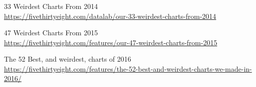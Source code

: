 \documentclass[12pt]{beamer}\usepackage[]{graphicx}\usepackage[]{color}
\begin{document}

\begin{frame}
\frametitle{}
\begin{center}
\end{center}
\end{frame}


\begin{frame}
\frametitle{}
\begin{center}
\end{center}
\end{frame}


\begin{frame}
\frametitle{}
\begin{center}
\end{center}
\end{frame}


\begin{frame}
\frametitle{}
\begin{center}
\end{center}
\end{frame}


\begin{frame}
\begin{center}
\Huge{}
\end{center}
\end{frame}


\begin{frame}
\frametitle{}

\bi
	\item 33 Weirdest Charts From 2014 \\
	{\tiny \url{https://fivethirtyeight.com/datalab/our-33-weirdest-charts-from-2014}}
	\item 47 Weirdest Charts From 2015  \\
	{\tiny \url{https://fivethirtyeight.com/features/our-47-weirdest-charts-from-2015}}
	\item The 52 Best, and weirdest, charts of 2016 \\
	{\tiny \url{https://fivethirtyeight.com/features/the-52-best-and-weirdest-charts-we-made-in-2016/}}
\ei

\end{frame}
\end{document}
